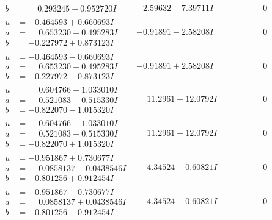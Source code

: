 \documentclass[1p]{elsarticle_modified}
\theoremstyle{definition}
\begin{document}
$$\begin{array}{c|c|c}
\begin{aligned}
b &= \phantom{-}0.293245 - 0.952720 I\end{aligned}
 & -2.59632 - 7.39711 I & \phantom{-0.000000 } 0 \\ \hline\begin{aligned}
u &= -0.464593 + 0.660693 I \\
a &= \phantom{-}0.653230 + 0.495283 I \\
b &= -0.227972 + 0.873123 I\end{aligned}
 & -0.91891 - 2.58208 I & \phantom{-0.000000 } 0 \\ \hline\begin{aligned}
u &= -0.464593 - 0.660693 I \\
a &= \phantom{-}0.653230 - 0.495283 I \\
b &= -0.227972 - 0.873123 I\end{aligned}
 & -0.91891 + 2.58208 I & \phantom{-0.000000 } 0 \\ \hline\begin{aligned}
u &= \phantom{-}0.604766 + 1.033010 I \\
a &= \phantom{-}0.521083 - 0.515330 I \\
b &= -0.822070 - 1.015320 I\end{aligned}
 & \phantom{-}11.2961 + 12.0792 I & \phantom{-0.000000 } 0 \\ \hline\begin{aligned}
u &= \phantom{-}0.604766 - 1.033010 I \\
a &= \phantom{-}0.521083 + 0.515330 I \\
b &= -0.822070 + 1.015320 I\end{aligned}
 & \phantom{-}11.2961 - 12.0792 I & \phantom{-0.000000 } 0 \\ \hline\begin{aligned}
u &= -0.951867 + 0.730677 I \\
a &= \phantom{-}0.0858137 - 0.0438546 I \\
b &= -0.801256 + 0.912454 I\end{aligned}
 & \phantom{-}4.34524 - 0.60821 I & \phantom{-0.000000 } 0 \\ \hline\begin{aligned}
u &= -0.951867 - 0.730677 I \\
a &= \phantom{-}0.0858137 + 0.0438546 I \\
b &= -0.801256 - 0.912454 I\end{aligned}
 & \phantom{-}4.34524 + 0.60821 I & \phantom{-0.000000 } 0 \\ \hline\begin{aligned}

\end{aligned}
\end{array}$$
\end{document}

